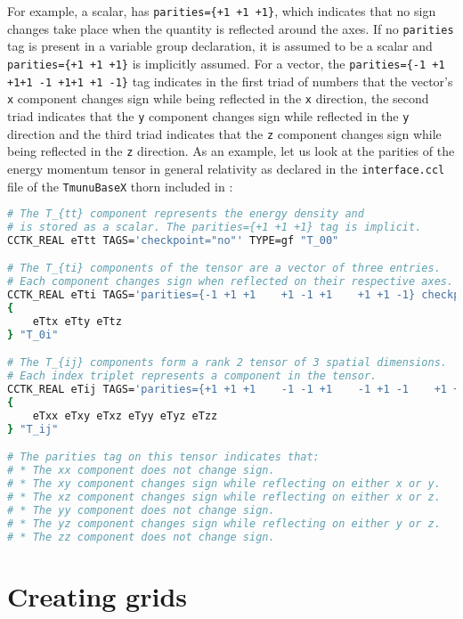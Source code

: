 For example, a scalar, has \texttt{parities=\{+1 +1 +1\}}, which indicates that no sign changes take place when the quantity is reflected around the axes. If no \texttt{parities} tag is present in a variable group declaration, it is assumed to be a scalar and \texttt{parities=\{+1 +1 +1\}} is implicitly assumed. For a vector, the \texttt{parities=\{-1 +1 +1\hspace{15pt}+1 -1 +1\hspace{15pt}+1 +1 -1\}} tag indicates in the first triad of numbers that the vector's \texttt{x} component changes sign while being reflected in the \texttt{x} direction, the second triad indicates that the \texttt{y} component changes sign while reflected in the \texttt{y} direction and the third triad indicates that the \texttt{z} component changes sign while being reflected in the \texttt{z} direction. As an example, let us look at the parities of the energy momentum tensor in general relativity as declared in the \texttt{interface.ccl} file of the \texttt{TmunuBaseX} thorn included in \CarpetX\space: 
%
\begin{lstlisting}[language=bash]
# The T_{tt} component represents the energy density and
# is stored as a scalar. The parities={+1 +1 +1} tag is implicit.
CCTK_REAL eTtt TAGS='checkpoint="no"' TYPE=gf "T_00"

# The T_{ti} components of the tensor are a vector of three entries.
# Each component changes sign when reflected on their respective axes.
CCTK_REAL eTti TAGS='parities={-1 +1 +1    +1 -1 +1    +1 +1 -1} checkpoint="no"' TYPE=gf
{ 
    eTtx eTty eTtz
} "T_0i"

# The T_{ij} components form a rank 2 tensor of 3 spatial dimensions.
# Each index triplet represents a component in the tensor.
CCTK_REAL eTij TAGS='parities={+1 +1 +1    -1 -1 +1    -1 +1 -1    +1 +1 +1    +1 -1 -1    +1 +1 +1} checkpoint="no"' TYPE=gf
{
    eTxx eTxy eTxz eTyy eTyz eTzz
} "T_ij"

# The parities tag on this tensor indicates that:
# * The xx component does not change sign.
# * The xy component changes sign while reflecting on either x or y.
# * The xz component changes sign while reflecting on either x or z.
# * The yy component does not change sign.
# * The yz component changes sign while reflecting on either y or z.
# * The zz component does not change sign.
\end{lstlisting}

\section{Creating grids}
\label{sec:grids}

